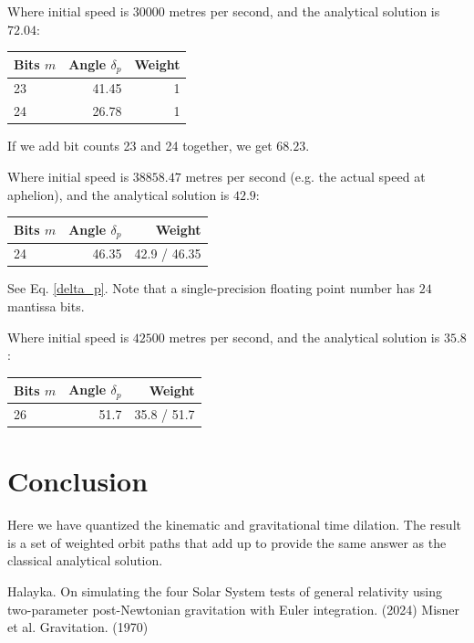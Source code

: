 \documentclass[12pt]{article}
\begin{document}
Where initial speed is $30000$ metres per second, and the analytical solution is $72.04$:
\begin{center}
\begin{tabular}{| l | r | r |}
  \hline
Bits $m$ & Angle $\delta_{p}$ & Weight\\
\hline
\hline
23 & 41.45 & 1\\
24 & 26.78 & 1 \\
  \hline  
\end{tabular}
\end{center}
If we add bit counts 23 and 24 together, we get $68.23$.

Where initial speed is $38858.47$ metres per second (e.g. the actual speed at aphelion), and the analytical solution is $42.9$:
\begin{center}
\begin{tabular}{| l | r | r |}
  \hline
Bits $m$ & Angle $\delta_{p}$ & Weight\\
\hline
\hline
24 & 46.35 & 42.9 / 46.35\\
  \hline  
\end{tabular}
\end{center}
See Eq. \ref{delta_p}.
Note that a single-precision floating point number has $24$ mantissa bits.

Where initial speed is $42500$ metres per second, and the analytical solution is $35.8$:
\begin{center}
\begin{tabular}{| l | r | r |}
  \hline
Bits $m$ & Angle $\delta_{p}$ & Weight\\
\hline
\hline
26 & 51.7 & 35.8 / 51.7 \\
  \hline  
\end{tabular}
\end{center}





\section{Conclusion}

Here we have quantized the kinematic and gravitational time dilation.
The result is a set of weighted orbit paths that add up to provide the same answer as the classical analytical solution.





\begin{thebibliography}{9}


 Halayka. On simulating the four Solar System tests of general relativity using two-parameter post-Newtonian gravitation with Euler integration. (2024)
 Misner et al. Gravitation. (1970)

\end{thebibliography}
\end{document}
